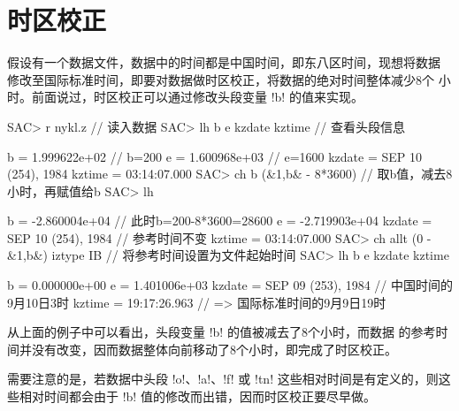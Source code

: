 \section{时区校正}
\label{sec:time-zone-correction}
假设有一个数据文件，数据中的时间都是中国时间，即东八区时间，现想将数据
修改至国际标准时间，即要对数据做时区校正，将数据的绝对时间整体减少8个
小时。前面说过，时区校正可以通过修改头段变量 !b! 的值来实现。
\begin{SACCode}
SAC> r nykl.z                          // 读入数据
SAC> lh b e kzdate kztime              // 查看头段信息

          b = 1.999622e+02             // b=200
          e = 1.600968e+03             // e=1600
     kzdate = SEP 10 (254), 1984
     kztime = 03:14:07.000
SAC> ch b (&1,b& - 8*3600)             // 取b值，减去8小时，再赋值给b
SAC> lh

          b = -2.860004e+04            // 此时b=200-8*3600=28600
          e = -2.719903e+04
     kzdate = SEP 10 (254), 1984       // 参考时间不变
     kztime = 03:14:07.000
SAC> ch allt (0 - &1,b&) iztype IB     // 将参考时间设置为文件起始时间
SAC> lh b e kzdate kztime

          b = 0.000000e+00
          e = 1.401006e+03
     kzdate = SEP 09 (253), 1984       // 中国时间的9月10日3时
     kztime = 19:17:26.963             // => 国际标准时间的9月9日19时
\end{SACCode}

从上面的例子中可以看出，头段变量 !b! 的值被减去了8个小时，而数据
的参考时间并没有改变，因而数据整体向前移动了8个小时，即完成了时区校正。

需要注意的是，若数据中头段 !o!、!a!、!f! 或
!tn! 这些相对时间是有定义的，则这些相对时间都会由于 !b!
值的修改而出错，因而时区校正要尽早做。
